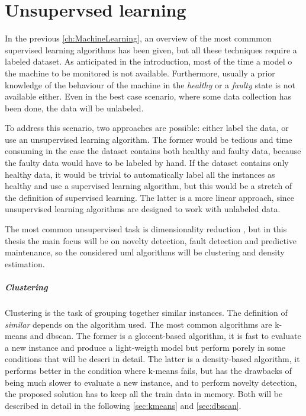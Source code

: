 \chapter{Unsupervsed learning}
\label{ch:Unsupervsed}

In the previous \autoref{ch:MachineLearning}, an overview of the most commmon supervised learning algorithms has been given, but all these techniques require a labeled dataset. As anticipated in the introduction, most of the time a model o the machine to be monitored is not available. Furthermore, usually a prior knowledge of the behaviour of the machine in the \emph{healthy} or a \emph{faulty} state is not available either. Even in the best case scenario, where some data collection has been done, the data will be unlabeled. 

To address this scenario, two approaches are possible: either label the data, or use an unsupervised learning algorithm. The former would be tedious and time consuming in the case the dataset contains both healthy and faulty data, because the faulty data would have to be labeled by hand. If the dataset contains only healthy data, it would be trivial to automatically label all the instances as healthy and use a supervised learning algorithm, but this would be a stretch of the definition of supervised learning. The latter is a more linear approach, since unsupervised learning algorithms are designed to work with unlabeled data.

The most common unsupervised task is dimensionality reduction , but in this thesis the main focus will be on novelty detection, fault detection and predictive maintenance, so the considered \gls{uml} algorithms will be clustering and density estimation.

\paragraph[]{Clustering}
Clustering is the task of grouping together similar instances. The definition of \emph{similar} depends on the algorithm used. The most common algorithms are {k-means} and \gls{dbscan}. The former is a \gls{glo:cent}-based algorithm, it is fast to evaluate a new instance and produce a light-weigth model but perform porely in some conditions that will be descri in detail. The latter is a density-based algorithm, it performs better in the condition where k-means fails, but has the drawbacks of being much slower to evaluate a new instance, and to perform novelty detection, the proposed solution has to keep all the train data in memory. Both will be described in detail in the following \autoref{sec:kmeans} and \autoref{sec:dbscan}.


